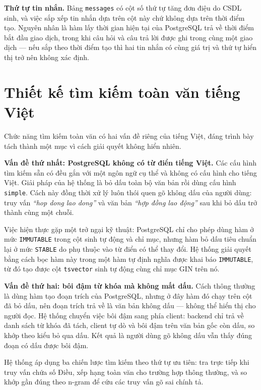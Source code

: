 \documentclass[12pt,a4paper]{report}
\numberwithin{equation}{chapter}
\numberwithin{figure}{chapter}
\numberwithin{table}{chapter}
\begin{document}
\textbf{Thứ tự tin nhắn.} Bảng \texttt{messages} có cột số thứ tự tăng đơn điệu do
CSDL sinh, và việc sắp xếp tin nhắn dựa trên cột này chứ không dựa trên thời điểm
tạo. Nguyên nhân là hàm lấy thời gian hiện tại của PostgreSQL trả về thời điểm bắt
đầu giao dịch, trong khi câu hỏi và câu trả lời được ghi trong cùng một giao dịch
--- nếu sắp theo thời điểm tạo thì hai tin nhắn có cùng giá trị và thứ tự hiển thị
trở nên không xác định.

\section{Thiết kế tìm kiếm toàn văn tiếng Việt}

Chức năng tìm kiếm toàn văn có hai vấn đề riêng của tiếng Việt, đáng trình bày
tách thành một mục vì cách giải quyết không hiển nhiên.

\textbf{Vấn đề thứ nhất: PostgreSQL không có từ điển tiếng Việt.} Các cấu hình
tìm kiếm sẵn có đều gắn với một ngôn ngữ cụ thể và không có cấu hình cho tiếng
Việt. Giải pháp của hệ thống là bỏ dấu toàn bộ văn bản rồi dùng cấu hình
\texttt{simple}. Cách này đồng thời xử lý luôn thói quen gõ không dấu của người
dùng: truy vấn \textit{``hop dong lao dong''} và văn bản \textit{``hợp đồng lao
động''} sau khi bỏ dấu trở thành cùng một chuỗi.

Việc hiện thực gặp một trở ngại kỹ thuật: PostgreSQL chỉ cho phép dùng hàm ở mức
\texttt{IMMUTABLE} trong cột sinh tự động và chỉ mục, nhưng hàm bỏ dấu tiêu chuẩn
lại ở mức \texttt{STABLE} do phụ thuộc vào từ điển có thể thay đổi. Hệ thống giải
quyết bằng cách bọc hàm này trong một hàm tự định nghĩa được khai báo
\texttt{IMMUTABLE}, từ đó tạo được cột \texttt{tsvector} sinh tự động cùng chỉ mục
GIN trên nó.

\textbf{Vấn đề thứ hai: bôi đậm từ khóa mà không mất dấu.} Cách thông thường là
dùng hàm tạo đoạn trích của PostgreSQL, nhưng ở đây hàm đó chạy trên cột đã bỏ
dấu, nên đoạn trích trả về là văn bản không dấu --- không thể hiển thị cho người
đọc. Hệ thống chuyển việc bôi đậm sang phía client: backend chỉ trả về danh sách
từ khóa đã tách, client tự dò và bôi đậm trên văn bản gốc còn dấu, so khớp theo
kiểu bỏ qua dấu. Kết quả là người dùng gõ không dấu vẫn thấy đúng đoạn có dấu được
bôi đậm.

Hệ thống áp dụng ba chiến lược tìm kiếm theo thứ tự ưu tiên: tra trực tiếp khi
truy vấn chứa số Điều, xếp hạng toàn văn cho trường hợp thông thường, và so khớp
gần đúng theo n-gram để cứu các truy vấn gõ sai chính tả.
\end{document}
